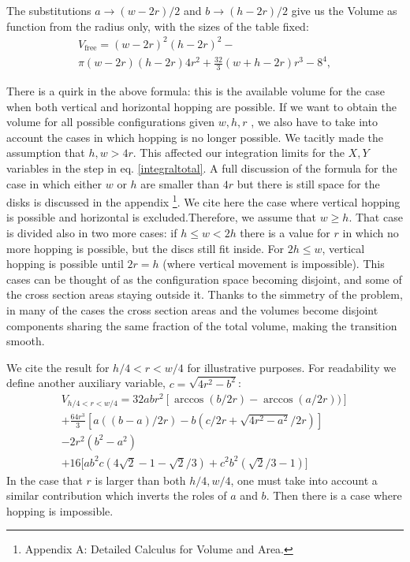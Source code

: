 \documentclass[letterpaper,10pt, jcp, aps]{revtex4-1}
\begin{document}
The substitutions $a\rightarrow (w-2r)/2$ and $b\rightarrow (h-2r)/2$ give us
 the Volume as function from the radius only, with the sizes of the table fixed:
\begin{multline}\label{volumewhd}
 V_\text{free} 
= (w-2r)^{2} (h-2r)^{2}  - \\ 
 \pi (w-2r)(h-2r) 4 r^{2} + 
\textstyle \frac{32}{3} (w+h-2r) r^{3}  
- 8^{4},
\end{multline}

There is a quirk in the above formula:
this is the available volume for the case when both
vertical and horizontal hopping are possible.
If we want to obtain the volume for all possible configurations
given $w,h,r$ ,
we also have to take into account the cases in which hopping is no
longer possible. 
We tacitly made the assumption that $h,w>4r$.  This affected our 
integration limits for the $X,Y$ variables in the step in eq. \ref{integraltotal}. 
A full discussion of the formula for the case in which either
$w$ or $h$ are smaller than $4r$ but there is still space for
the disks is discussed in the appendix
\footnote{Appendix A: Detailed Calculus for Volume and Area.}.
We cite here the case where vertical hopping is possible
and horizontal is excluded.Therefore, we assume that $w \geq h$.
That case is divided also in two more cases: if
$ h \leq  w < 2 h $ there is a value for $r$ in which no more hopping is possible,
but the discs still fit inside. For $ 2 h \leq w $, vertical hopping is
possible until $ 2 r= h$ (where vertical movement is impossible). This cases
can be thought of as the configuration space becoming disjoint, and
some of the cross section areas staying outside it. Thanks to the simmetry of
the problem, in many of the cases the cross section areas and the
volumes become disjoint components sharing the same fraction of
the total volume, making the transition smooth.

We cite the  result for $h/4  <r< w/4$ for illustrative purposes.
For readability we define another auxiliary variable,
$c=\sqrt{4r^2-b^2}$:
\begin{multline}\label{VolumenCasoFeo}
V_{h/4<r<w/4} = 32abr^2[\arccos(b/2r)-\arccos(a/2r))]\\
+\frac{64 r^3}{3 }[a((b-a)/2r)-b(c/2r+\sqrt{4r^2-a^2}/2r)]\\
-2r^2 (b^2-a^2)\\ 
+16[ a b^2 c (4\sqrt{2}-1-\sqrt{2}/3)
+c^2b^2 (\sqrt{2}/3-1) \big]
\end{multline}
In the case that $r$ is larger than both $h/4, w/4$, one must take
into account a similar
contribution which inverts the roles of $a$ and $b$. Then there is
a case where hopping is impossible. 
\end{document}
